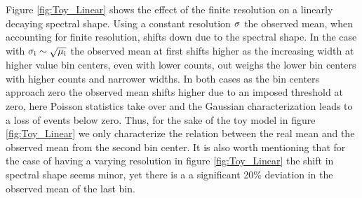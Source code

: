 Figure \ref{fig:Toy_Linear} shows the effect of the finite resolution on a linearly decaying spectral shape. Using a constant resolution $\rm \sigma$ the observed mean, when accounting for finite resolution, shifts down due to the spectral shape. In the case with $\rm \sigma_i \sim \sqrt{\mu_i} $ the observed mean at first shifts higher as the increasing width at higher value bin centers, even with lower counts, out weighs the lower bin centers with higher counts and narrower widths. In both cases as the bin centers approach zero the observed mean shifts higher due to an imposed threshold at zero, here Poisson statistics take over and the Gaussian characterization leads to a loss of events below zero. Thus, for the sake of the toy model in figure \ref{fig:Toy_Linear} we only characterize the relation between the real mean and the observed mean from the second bin center. It is also worth mentioning that for the case of having a varying resolution in figure \ref{fig:Toy_Linear} the shift in spectral shape seems minor, yet there is a a significant 20\% deviation in the observed mean of the last bin.

